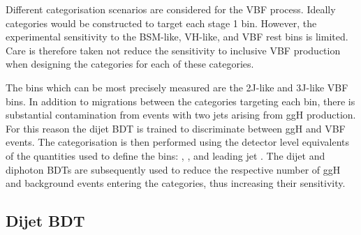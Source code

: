 Different categorisation scenarios are considered for the VBF process.
Ideally categories would be constructed to target each stage 1 bin.
However, the experimental sensitivity to the BSM-like, VH-like, and VBF rest bins is limited.
Care is therefore taken not reduce the sensitivity to inclusive VBF production when designing 
the categories for each of these categories.

The bins which can be most precisely measured are the 2J-like and 3J-like VBF bins.
In addition to migrations between the categories targeting each bin, 
there is substantial contamination from events with two jets arising from ggH production.
For this reason the dijet BDT is trained to discriminate between ggH and VBF events.
The categorisation is then performed using the detector level equivalents
of the quantities used to define the bins: \mjj, \ptHjj, and leading jet \pt.
The dijet and diphoton BDTs are subsequently used 
to reduce the respective number of ggH and background events entering the categories, 
thus increasing their sensitivity.

\subsection{Dijet BDT}

